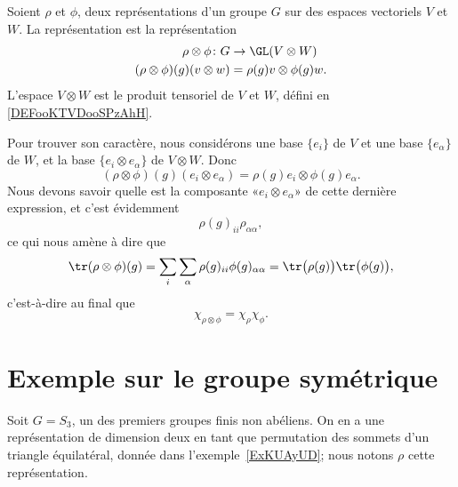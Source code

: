 \begin{definition}
    Soient \( \rho\) et \( \phi\), deux représentations d'un groupe \( G\) sur des espaces vectoriels \( V\) et \( W\). La représentation  est la représentation
    \begin{equation}
        \begin{aligned}
            \rho\otimes\phi\colon G&\to \GL(V\otimes W) \\
            (\rho\otimes\phi)(g)(v\otimes w)&=\rho(g)v\otimes \phi(g)w.
        \end{aligned}
    \end{equation}
    L'espace \( V\otimes W\) est le produit tensoriel de \( V\) et \( W\), défini en \ref{DEFooKTVDooSPzAhH}.
\end{definition}
Pour trouver son caractère, nous considérons une base \( \{ e_i \}\) de \( V\) et une base \( \{ e_{\alpha} \}\) de \( W\), et la base \( \{ e_i\otimes e_{\alpha} \}\) de \( V\otimes W\). Donc
\begin{equation}
    (\rho\otimes \phi)(g)(e_i\otimes e_{\alpha})=\rho(g)e_i\otimes \phi(g)e_{\alpha}.
\end{equation}
Nous devons savoir quelle est la composante «\( e_i\otimes e_{\alpha}\)» de cette dernière expression, et c'est évidemment
\begin{equation}
    \rho(g)_{ii}\rho_{\alpha\alpha},
\end{equation}
ce qui nous amène à dire que
\begin{equation}
    \tr(\rho\otimes \phi)(g)=\sum_i\sum_{\alpha}\rho(g)_{ii}\phi(g)_{\alpha\alpha}=\tr\big( \rho(g) \big)\tr\big( \phi(g) \big),
\end{equation}
c'est-à-dire au final que
\begin{equation}    \label{EqOTmvfjf}
    \chi_{\rho\otimes \phi}=\chi_{\rho}\chi_{\phi}.
\end{equation}

\section{Exemple sur le groupe symétrique}

Soit \( G=S_3\), un des premiers groupes finis non abéliens. On en a une représentation de dimension deux en tant que permutation des sommets d'un triangle équilatéral, donnée dans l'exemple~\ref{ExKUAyUD}; nous notons \( \rho\) cette représentation.

